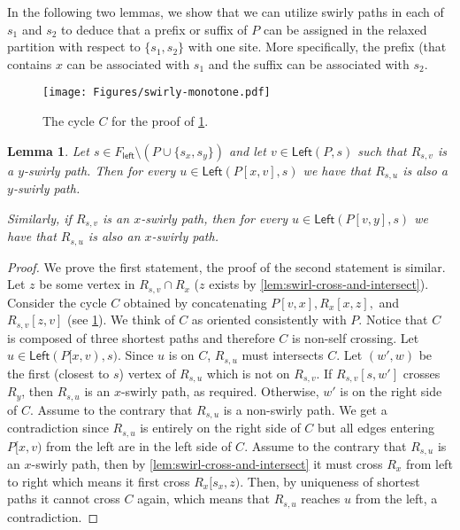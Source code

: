 \documentclass{article}
\newcommand{\Left}{\mathsf{Left}}
\newcommand{\leftside}{\mathsf{left}}
\newtheorem{lemma}{Lemma}
\begin{document}
In the following two lemmas, we show that we can utilize swirly paths in each of $s_1$ and $s_2$ to deduce that a prefix or suffix of $P$ can be assigned in the relaxed partition with respect to $\{s_1,s_2\}$ with one site.
More specifically, the prefix (that contains $x$ can be associated with $s_1$ and the suffix can be associated with $s_2$.
\begin{figure}[ht]
    \centering
    \texttt{[image: Figures/swirly-monotone.pdf]}
    \caption{The cycle $C$ for the proof of \cref{lem:swirly-monotone}.}
    \label{fig:swirly-monotone}
\end{figure}
\begin{lemma}\label{lem:swirly-monotone}
    Let $s\in F_{\leftside}\setminus (P\cup \{s_x,s_y\})$ and let $v\in \Left(P,s)$ such that $R_{s,v}$ is a $y$-swirly path.
    Then for every $u\in \Left(P[x,v],s)$ we have that $R_{s,u}$ is also a $y$-swirly path.

    Similarly, if $R_{s,v}$ is an $x$-swirly path, then for every $u\in \Left(P[v,y],s)$ we have that $R_{s,u}$ is also an $x$-swirly path.
\end{lemma}
\begin{proof}
    We prove the first statement, the proof of the second statement is similar.
    Let $z$ be some vertex in $R_{s,v}\cap R_x$ ($z$ exists by \cref{lem:swirl-cross-and-intersect}).
    Consider the cycle $C$ obtained by concatenating $P[v,x], R_x[x,z],$  and $R_{s,v}[z,v]$ (see \cref{fig:swirly-monotone}).
    We think of $C$ as oriented consistently with $P$.
    Notice that $C$ is composed of three shortest paths and therefore $C$ is non-self crossing.
    Let $u\in\Left(P[x,v),s)$.
    Since $u$ is on $C$, $R_{s,u}$ must intersects $C$.
    Let $(w',w)$ be the first (closest to $s$) vertex of $R_{s,u}$ which is not on $R_{s,v}$.
    If $R_{s,v}[s,w']$ crosses $R_y$, then $R_{s,u}$ is an $x$-swirly path, as required.
    Otherwise, $w'$ is on the right side of $C$.
    Assume to the contrary that $R_{s,u}$ is a non-swirly path.
    We get a contradiction since $R_{s,u}$ is entirely on the right side of $C$ but all edges entering $P[x,v)$ from the left are in the left side of $C$.
    Assume to the contrary that $R_{s,u}$ is an $x$-swirly path, then by \cref{lem:swirl-cross-and-intersect} it must cross $R_x$ from left to right which means it first cross $R_x[s_x,z)$.
    Then, by uniqueness of shortest paths it cannot cross $C$ again, which means that $R_{s,u}$ reaches $u$ from the left, a contradiction.
\end{proof}
\end{document}
